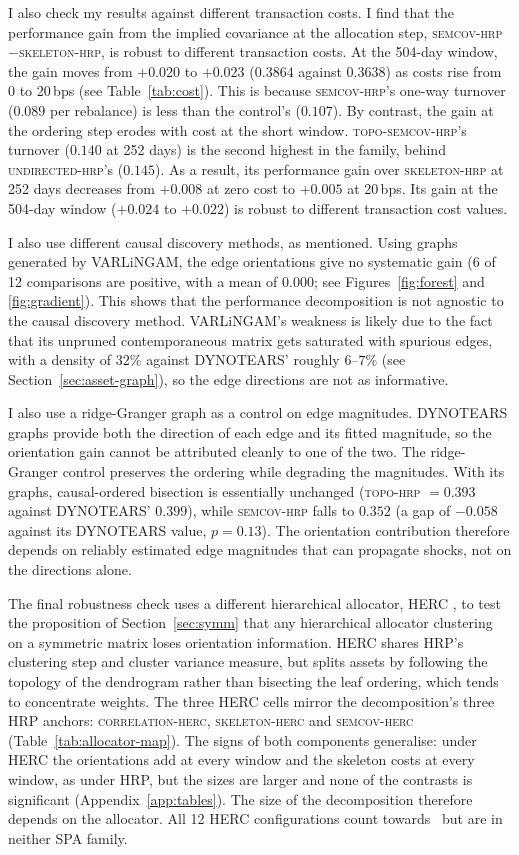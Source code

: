 \documentclass[11pt, a4paper]{report}
\newcommand{\skelhrp}{\textsc{skeleton-hrp}}
\newcommand{\undirhrp}{\textsc{undirected-hrp}}
\newcommand{\semcovhrp}{\textsc{semcov-hrp}}
\newcommand{\topohrp}{\textsc{topo-hrp}}
\newcommand{\toposemcovhrp}{\textsc{topo-semcov-hrp}}
\newcommand{\corrherc}{\textsc{correlation-herc}}
\newcommand{\skelherc}{\textsc{skeleton-herc}}
\newcommand{\semcovherc}{\textsc{semcov-herc}}
\begin{document}
I also check my results against different transaction costs.
I find that the performance gain from the implied
covariance at the allocation step, \semcovhrp{}$-$\skelhrp{}, is robust to different transaction costs. At the 504-day window, the gain moves from $+0.020$ to $+0.023$ ($0.3864$ against $0.3638$) as
costs rise from 0 to 20\,bps (see Table~\ref{tab:cost}).
This is because \semcovhrp{}'s one-way turnover ($0.089$ per rebalance) is less than the control's ($0.107$).
By contrast, the gain at the ordering step erodes with cost at the short window.
\toposemcovhrp{}'s turnover ($0.140$ at 252 days) is the second highest in the family, behind \undirhrp{}'s ($0.145$). As a result, its performance gain over \skelhrp{} at 252 days decreases from $+0.008$ at zero cost to $+0.005$ at 20\,bps.
Its gain at the 504-day window ($+0.024$ to $+0.022$) is robust to different transaction cost values.

I also use different causal discovery methods, as mentioned.
Using graphs generated by VARLiNGAM, the edge orientations give no systematic gain (6 of 12 comparisons are
positive, with a mean of $0.000$; see Figures~\ref{fig:forest} and \ref{fig:gradient}).
This shows that the performance decomposition is not agnostic to the causal discovery method.
VARLiNGAM's weakness is likely due to the fact that its unpruned contemporaneous matrix gets saturated with spurious edges, with a density of $32\%$ against DYNOTEARS' roughly $6$--$7\%$ (see Section~\ref{sec:asset-graph}), so the edge directions are not as informative.

I also use a ridge-Granger graph as a control on edge magnitudes.
DYNOTEARS graphs provide both the direction of each edge and its fitted magnitude, so the orientation gain cannot be attributed cleanly to one of the two. The ridge-Granger control preserves the ordering while degrading the magnitudes.
With its graphs, causal-ordered bisection is essentially unchanged (\topohrp{} $=0.393$ against DYNOTEARS' $0.399$), while \semcovhrp{} falls to $0.352$ (a gap of $-0.058$ against its DYNOTEARS value, $p=0.13$).
The orientation contribution therefore depends on reliably estimated edge magnitudes that can propagate shocks, not on the directions alone.

The final robustness check uses a different hierarchical allocator, HERC \cite{raffinot2018herc}, to test the proposition of Section~\ref{sec:symm} that any hierarchical allocator clustering on a symmetric matrix loses orientation information.
HERC shares HRP's clustering step and cluster variance measure, but splits assets by following the topology of the dendrogram rather than bisecting the leaf ordering, which tends to concentrate weights.
The three HERC cells mirror the decomposition's three HRP anchors: \corrherc{}, \skelherc{} and \semcovherc{} (Table~\ref{tab:allocator-map}).
The signs of both components generalise: under HERC the orientations add at every window and the skeleton costs at every window, as under HRP, but the sizes are larger and none of the contrasts is significant (Appendix~\ref{app:tables}). The size of the decomposition therefore depends on the allocator.
All 12 HERC configurations count towards \rsNtrials\ but are in neither SPA family.
\end{document}
